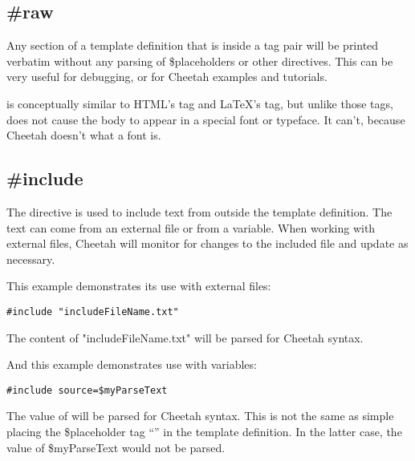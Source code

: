 

\subsection{\#raw}
\label{output.raw}

Any section of a template definition that is inside a  tag pair will be printed verbatim without any parsing of
\$placeholders or other directives. This can be very useful for debugging, or
for Cheetah examples and tutorials.

 is conceptually similar to HTML's  tag and LaTeX's
\code{\\verbatim\{\}} tag, but unlike those tags,  does not cause
the body to appear in a special font or typeface.  It can't, because Cheetah
doesn't what a font is.  


\subsection{\#include}
\label{output.include}

The  directive is  used to include text from outside the
template definition.  The text can come from an external file or from a
 variable.  When working with external files, Cheetah will
monitor for changes to the included file and update as necessary.  

This example demonstrates its use with external files:
\begin{verbatim}
#include "includeFileName.txt"
\end{verbatim}
The content of "includeFileName.txt" will be parsed for Cheetah syntax.

And this example demonstrates use with  variables:
\begin{verbatim}
#include source=$myParseText
\end{verbatim}
The value of  will be parsed for Cheetah syntax. This is not
the same as simple placing the \$placeholder tag ``'' in
the template definition.  In the latter case, the value of \$myParseText would
not be parsed.

